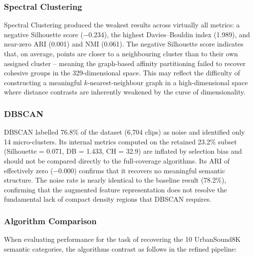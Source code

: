 \documentclass[runningheads,a4paper,11pt]{report}
\begin{document}
\subsubsection{Spectral Clustering}

Spectral Clustering produced the weakest results across virtually all metrics: a negative Silhouette score ($-$0.234), the highest Davies--Bouldin index (1.989), and near-zero ARI (0.001) and NMI (0.061). The negative Silhouette score indicates that, on average, points are closer to a neighbouring cluster than to their own assigned cluster -- meaning the graph-based affinity partitioning failed to recover cohesive groups in the 329-dimensional space. This may reflect the difficulty of constructing a meaningful $k$-nearest-neighbour graph in a high-dimensional space where distance contrasts are inherently weakened by the curse of dimensionality.

\subsubsection{DBSCAN}

DBSCAN labelled 76.8\% of the dataset (6,704 clips) as noise and identified only 14 micro-clusters. Its internal metrics computed on the retained 23.2\% subset (Silhouette = 0.071, DB = 1.433, CH = 32.9) are inflated by selection bias and should not be compared directly to the full-coverage algorithms. Its ARI of effectively zero ($-$0.000) confirms that it recovers no meaningful semantic structure. The noise rate is nearly identical to the baseline result (78.2\%), confirming that the augmented feature representation does not resolve the fundamental lack of compact density regions that DBSCAN requires.

\subsubsection{Algorithm Comparison}

When evaluating performance for the task of recovering the 10 UrbanSound8K semantic categories, the algorithms contrast as follows in the refined pipeline:
\end{document}
